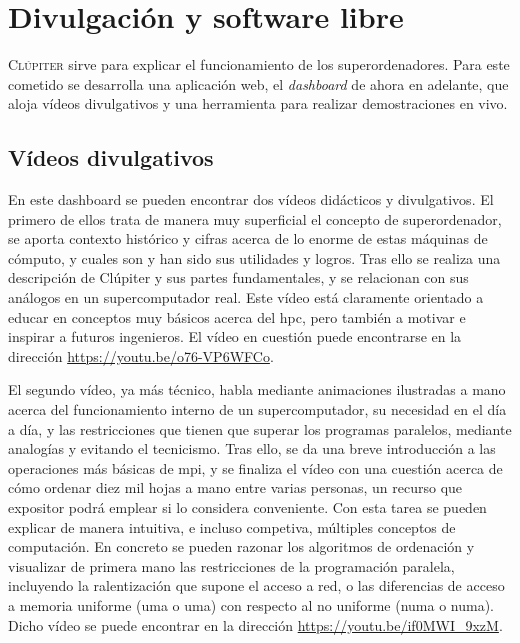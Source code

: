 \chapter{Divulgación y software libre}
\label{chap:aplicacion_web}

\lettrine{C}{lúpiter} sirve para explicar el funcionamiento de los superordenadores. Para este cometido se desarrolla una aplicación web, el \textit{dashboard} de ahora en adelante, que aloja vídeos divulgativos y una herramienta para realizar demostraciones en vivo.

\section{Vídeos divulgativos}
En este dashboard se pueden encontrar dos vídeos didácticos y divulgativos. El primero de ellos trata de manera muy superficial el concepto de superordenador, se aporta contexto histórico y cifras acerca de lo enorme de estas máquinas de cómputo, y cuales son y han sido sus utilidades y logros. Tras ello se realiza una descripción de Clúpiter y sus partes fundamentales, y se relacionan con sus análogos en un supercomputador real. Este vídeo está claramente orientado a educar en conceptos muy básicos acerca del \acrshort{hpc}, pero también a motivar e inspirar a futuros ingenieros. El vídeo en cuestión puede encontrarse en la dirección \url{https://youtu.be/o76-VP6WFCo}.

El segundo vídeo, ya más técnico, habla mediante animaciones ilustradas a mano acerca del funcionamiento interno de un supercomputador, su necesidad en el día a día, y las restricciones que tienen que superar los programas paralelos, mediante analogías y evitando el tecnicismo. Tras ello, se da una breve introducción a las operaciones más básicas de \acrshort{mpi}, y se finaliza el vídeo con una cuestión acerca de cómo ordenar diez mil hojas a mano entre varias personas, un recurso que expositor podrá emplear si lo considera conveniente. Con esta tarea se pueden explicar de manera intuitiva, e incluso competiva, múltiples conceptos de computación. En concreto se pueden razonar los algoritmos de ordenación y visualizar de primera mano las restricciones de la programación paralela, incluyendo la ralentización que supone el acceso a red, o las diferencias de acceso a memoria uniforme (\acrshort{uma} o \acrlong{uma}) con respecto al no uniforme (\acrshort{numa} o \acrlong{numa}). Dicho vídeo se puede encontrar en la dirección \url{https://youtu.be/if0MWI_9xzM}.

